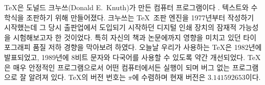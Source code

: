 \TeX 은 도널드 크누쓰(Donald E.\
Knuth)가 만든 컴퓨터 프로그램이다 \cite{texbook}. 텍스트와 수학식을
조판하기 위해 만들어졌다. 크누쓰는 \TeX\ 조판 엔진을 1977년부터
작성하기 시작했는데 그 당시 출판업에서 도입되기 시작하던 디지털 인쇄
장치의 잠재적 가능성을 시험해보고자 한 것이었다. 특히 자신의 책과
논문에까지 영향을 미치고 있던 타이포그래피 품질 저하 경향을 막아보려
하였다. 오늘날 우리가 사용하는 \TeX 은 1982년에 발표되었고, 1989년에
8비트 문자와 다국어를 사용할 수 있도록 약간 개선되었다. \TeX 은 매우
안정적인 프로그램으로서 어떤 컴퓨터에서든 실행이 되며 버그 없는
프로그램으로 잘 알려져 있다. \TeX 의 버전 번호는 $\pi$에 수렴하며 현재 버전은 $3.141592653$이다.
                                                                       
